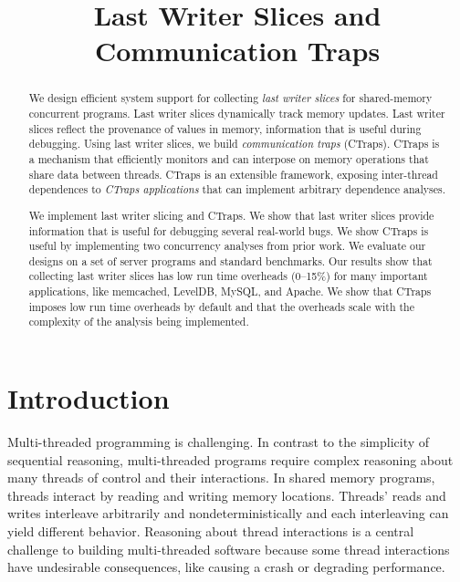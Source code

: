\documentclass[preprint,9pt]{sigplanconf}
\title{\Large Last Writer Slices and Communication Traps}
\newcommand{\ctraps}{CTraps\xspace}
\begin{document}
\maketitle

\begin{abstract}

We design efficient system support for collecting {\em last writer slices} for
shared-memory concurrent programs.  Last writer slices dynamically track memory
updates.  Last writer slices reflect the provenance of values in memory,
information that is useful during debugging.   Using last writer slices,
we build {\em communication traps} (\ctraps).  \ctraps is a mechanism that
efficiently monitors and can interpose on memory operations that share data
between threads.  \ctraps is an extensible framework, exposing
inter-thread dependences to {\em \ctraps applications} that can implement
arbitrary dependence analyses.  

We implement last writer slicing and \ctraps.  We show that last writer slices
provide information that is useful for debugging several real-world bugs.  We
show \ctraps is useful by implementing two concurrency analyses from prior
work.  We evaluate our designs on a set of server programs and standard
benchmarks.  Our results show that collecting last writer slices has low run
time overheads (0--15\%) for many important applications, like memcached,
LevelDB, MySQL, and Apache.  We show that \ctraps imposes low run time
overheads by default and that the overheads scale with the complexity of the
analysis being implemented.

\end{abstract}

\section{Introduction}
Multi-threaded programming is challenging.  In contrast to the simplicity of
sequential reasoning, multi-threaded programs require complex reasoning about
many threads of control and their interactions.  In shared memory programs,
threads interact by reading and writing memory locations.  Threads' reads and
writes interleave arbitrarily and nondeterministically and each interleaving
can yield different behavior.  Reasoning about thread interactions is a central
challenge to building multi-threaded software because some thread interactions
have undesirable consequences, like causing a crash or degrading performance.
\end{document}
